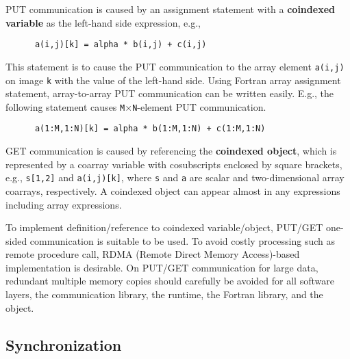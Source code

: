PUT communication is caused by an assignment statement with a {\bf coindexed variable} 
as the left-hand side expression, e.g.,
\begin{verbatim}
      a(i,j)[k] = alpha * b(i,j) + c(i,j)
\end{verbatim}
This statement is to cause the PUT communication to the array element {\tt a(i,j)}
on image {\tt k} with the value of the left-hand side.
%
Using Fortran array assignment statement, array-to-array PUT communication 
can be written easily. E.g., the following statement causes 
{\tt M}$\times${\tt N}-element PUT communication.
\begin{verbatim}
      a(1:M,1:N)[k] = alpha * b(1:M,1:N) + c(1:M,1:N)
\end{verbatim}

GET communication is caused by referencing the {\bf coindexed object}, 
which is represented by a coarray variable with cosubscripts enclosed by square brackets, 
e.g., {\tt s[1,2]} and {\tt a(i,j)[k]}, where {\tt s} and {\tt a} are scalar and 
two-dimensional array coarrays, respectively.
%
A coindexed object can appear almost in any expressions including array expressions.

\requirement
To implement definition/reference to coindexed variable/object,
PUT/GET one-sided communication is suitable to be used.
%
To avoid costly processing such as remote procedure call, 
RDMA (Remote Direct Memory Access)-based implementation is desirable.
%
On PUT/GET communication for large data, redundant multiple memory copies 
should carefully be avoided for all software layers, 
the communication library, the runtime, the Fortran library, and the object.



\subsection{Synchronization}\label{sec:spec-sync}


